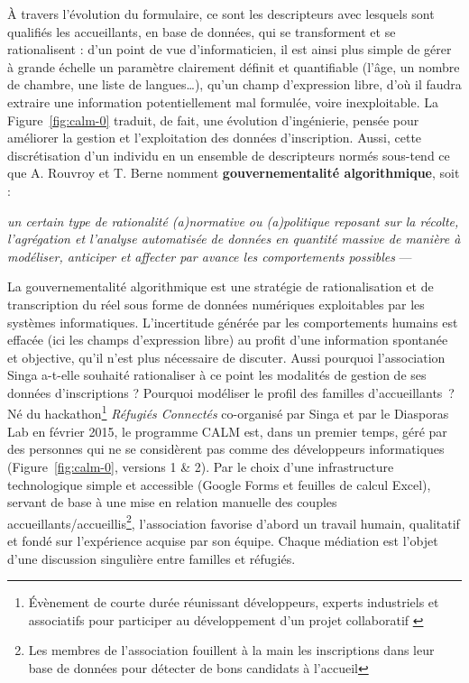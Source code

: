 \documentclass[symmetric,justified,marginals=raggedouter]{tufte-book}
\begin{document}
À travers l'évolution du formulaire, ce sont les descripteurs avec lesquels sont qualifiés les accueillants, en base de données, qui se transforment et se rationalisent : d'un point de vue d'informaticien, il est ainsi plus simple de gérer à grande échelle un paramètre clairement définit et quantifiable (l'âge, un nombre de chambre, une liste de langues\ldots{}), qu'un champ d'expression libre, d'où il faudra extraire une information potentiellement mal formulée, voire inexploitable. La Figure~\ref{fig:calm-0} traduit, de fait, une évolution d'ingénierie, pensée pour améliorer la gestion et l'exploitation des données d'inscription. Aussi, cette discrétisation d'un individu en un ensemble de descripteurs normés sous-tend ce que A. Rouvroy et T. Berne nomment \textbf{gouvernementalité algorithmique}, soit :\\

\begin{fullwidth}
\og\textit{un certain type de rationalité (a)normative ou (a)politique reposant sur la récolte, l’agrégation et l’analyse automatisée de données en quantité massive de manière à modéliser, anticiper et affecter par avance les comportements possibles}\fg{} --- \citep[p.11]{rouvroy_gouvernementalite_2013}\\
\end{fullwidth}

\noindent La gouvernementalité algorithmique est une stratégie de rationalisation et de transcription du réel sous forme de données numériques exploitables par les systèmes informatiques. L'incertitude générée par les comportements humains est effacée (ici les champs d'expression libre) au profit d'une information spontanée et objective, qu'il n'est plus nécessaire de discuter. Aussi pourquoi l'association Singa a-t-elle souhaité rationaliser à ce point les modalités de gestion de ses données d'inscriptions ? Pourquoi modéliser le profil des familles d'accueillants~?\\

\noindent Né du hackathon\footnote{\RaggedOuter Évènement de courte durée réunissant développeurs, experts industriels et associatifs pour participer au développement d'un projet collaboratif \citep{lobbe_concevoir_2018}} \textit{Réfugiés Connectés} co-organisé par Singa et par le Diasporas Lab en février 2015, le programme CALM est, dans un premier temps, géré par des personnes qui ne se considèrent pas comme des développeurs informatiques (Figure~\ref{fig:calm-0}, versions 1 \& 2). Par le choix d'une infrastructure technologique simple et accessible (Google Forms et feuilles de calcul Excel), servant de base à une mise en relation manuelle des couples accueillants/accueillis\footnote{\RaggedOuter Les membres de l'association fouillent à la main les inscriptions dans leur base de données pour détecter de bons candidats à l'accueil}, l'association favorise d'abord un travail humain, qualitatif et fondé sur l'expérience acquise par son équipe. Chaque médiation est l'objet d'une discussion singulière entre familles et réfugiés.
\end{document}
